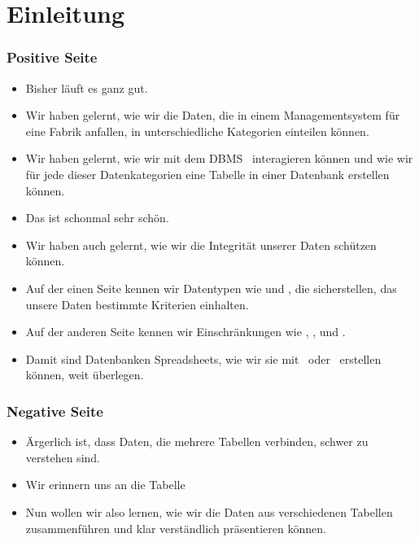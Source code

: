 \documentclass[aspectratio=169,mathserif,notheorems]{beamer}%
\subtitle{12.~Fabrik-Datenbank:~Joins und Views}%
\begin{document}
%
%
\startPresentation%
%
\section{Einleitung}%
%
\begin{frame}%
\frametitle{Positive Seite}%
\begin{itemize}%
\item Bisher läuft es ganz gut.%
\item<2-> Wir haben gelernt, wie wir die Daten, die in einem Managementsystem für eine Fabrik anfallen, in unterschiedliche Kategorien einteilen können.%
\item<3-> Wir haben gelernt, wie wir mit dem DBMS \postgresql\ interagieren können und wie wir für jede dieser Datenkategorien eine Tabelle in einer Datenbank erstellen können.%
\item<4-> Das ist schonmal sehr schön.%
\item<5-> Wir haben auch gelernt, wie wir die Integrität unserer Daten schützen können.%
\item<6-> Auf der einen Seite kennen wir Datentypen wie  und , die sicherstellen, das unsere Daten bestimmte Kriterien einhalten.
\item<7-> Auf der anderen Seite kennen wir Einschränkungen wie , ,  und .%
\item<8-> Damit sind Datenbanken Spreadsheets, wie wir sie mit \microsoftExcel\ oder \libreofficeCalc\ erstellen können, weit überlegen.%
\end{itemize}%
\end{frame}%
%
\begin{frame}[t]
\frametitle{Negative Seite}%
\begin{itemize}%
%
\item<3-> Ärgerlich ist, dass Daten, die mehrere Tabellen verbinden, schwer zu verstehen sind.%
\item<4-> Wir erinnern uns an die Tabelle~%
\item<5-> Nun wollen wir also lernen, wie wir die Daten aus verschiedenen Tabellen zusammenführen und klar verständlich präsentieren können.%
\end{itemize}%
%
\end{frame}
%
\end{document}

